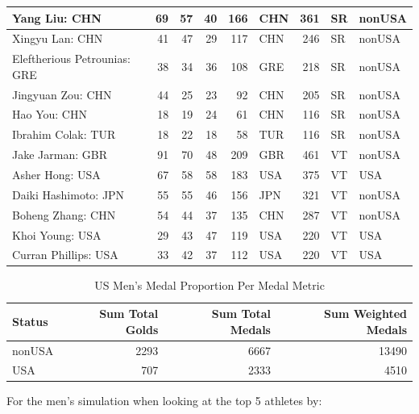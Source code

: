 \documentclass[
  10.5pt,
  letterpaper,
  DIV=11,
  numbers=noendperiod]{scrartcl}
\begin{document}
\begin{table}[H]
\begin{tabular}[t]{l|r|r|r|r|l|r|l|l}
\hline
Yang Liu: CHN & 69 & 57 & 40 & 166 & CHN & 361 & SR & nonUSA\\
\hline
Xingyu Lan: CHN & 41 & 47 & 29 & 117 & CHN & 246 & SR & nonUSA\\
\hline
Eleftherious Petrounias: GRE & 38 & 34 & 36 & 108 & GRE & 218 & SR & nonUSA\\
\hline
Jingyuan Zou: CHN & 44 & 25 & 23 & 92 & CHN & 205 & SR & nonUSA\\
\hline
Hao You: CHN & 18 & 19 & 24 & 61 & CHN & 116 & SR & nonUSA\\
\hline
Ibrahim Colak: TUR & 18 & 22 & 18 & 58 & TUR & 116 & SR & nonUSA\\
\hline
Jake Jarman: GBR & 91 & 70 & 48 & 209 & GBR & 461 & VT & nonUSA\\
\hline
Asher Hong: USA & 67 & 58 & 58 & 183 & USA & 375 & VT & USA\\
\hline
Daiki Hashimoto: JPN & 55 & 55 & 46 & 156 & JPN & 321 & VT & nonUSA\\
\hline
Boheng Zhang: CHN & 54 & 44 & 37 & 135 & CHN & 287 & VT & nonUSA\\
\hline
Khoi Young: USA & 29 & 43 & 47 & 119 & USA & 220 & VT & USA\\
\hline
Curran Phillips: USA & 33 & 42 & 37 & 112 & USA & 220 & VT & USA\\
\hline
\end{tabular}
\end{table}

\begin{table}[H]

\caption{US Men's Medal Proportion Per Medal Metric}
\centering
\fontsize{8}{10}\selectfont
\begin{tabular}[t]{l|r|r|r}
\hline
Status & Sum Total Golds & Sum Total Medals & Sum Weighted Medals\\
\hline
nonUSA & 2293 & 6667 & 13490\\
\hline
USA & 707 & 2333 & 4510\\
\hline
\end{tabular}
\end{table}

For the men's simulation when looking at the top 5 athletes by:
\end{document}
